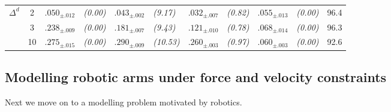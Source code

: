 \begin{table}[t]
\begin{tabular}{ccr@{}lr@{}lr@{}lr@{}lc}
		\midrule
		\multirow{3}{*}{\(\Delta^d\)}
		                       & 2                    & \(.050_{\pm{.012}}\)                             & \emph{(0.00)}                                  & \(.043_{\pm{.002}}\)                             & \emph{(9.17)}                                  & \({.032_{\pm{.007}}}\) & \emph{(0.82)} & \(.055_{\pm{.013}}\) & \emph{(0.00)} & 96.4 \\
		                       & 3                    & \(.238_{\pm{.009}}\)                             & \emph{(0.00)}                                  & \(.181_{\pm{.007}}\)                             & \emph{(9.43)}                                  & \({.121_{\pm{.010}}}\) & \emph{(0.78)} & \(.068_{\pm{.014}}\) & \emph{(0.00)} & 96.3 \\
		                       & 10                   & \(.275_{\pm{.015}}\)                             & \emph{(0.00)}                                  & \(.290_{\pm{.009}}\)                             & \emph{(10.53)}                                 & \({.260_{\pm{.003}}}\) & \emph{(0.97)} & \(.060_{\pm{.003}}\) & \emph{(0.00)} & 92.6 \\
		\bottomrule
	\end{tabular}
\end{table}

\subsection{Modelling robotic arms under force and velocity constraints}
\label{sec:exp_constrained_robot}
Next we move on to a modelling problem motivated by robotics.

